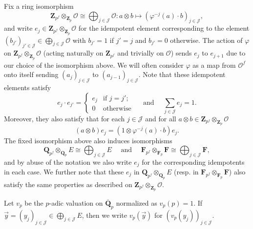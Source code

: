 \documentclass[11pt]{amsart}
\theoremstyle{definition}
\numberwithin{equation}{subsection}
\theoremstyle{plain}
\theoremstyle{plain}
\theoremstyle{plain}
\theoremstyle{plain}
\theoremstyle{plain}
\theoremstyle{plain}
\theoremstyle{plain}
\theoremstyle{plain}
\theoremstyle{plain}
\theoremstyle{plain}
\theoremstyle{plain}
\theoremstyle{plain}
\theoremstyle{definition}
\theoremstyle{definition}
\theoremstyle{definition}
\theoremstyle{remark}
\renewcommand{\(}{\textup{(}}
\renewcommand{\)}{\textup{)}}
\newcommand{\Q}{\mathbf{Q}}
\newcommand{\Z}{\mathbf{Z}}
\newcommand{\F}{\mathbf{F}}
\newcommand{\cO}{\mathcal{O}}
\newcommand{\cJ}{\mathcal{J}}
\begin{document}
Fix a ring isomorphism
\begin{equation}\label{eq: ring coefficient}
\Z_{p^f}\otimes_{\Z_p}\cO\cong \bigoplus_{j\in\cJ}\cO: a\otimes b \mapsto \left(\varphi^{-j}(a)\cdot b\right)_{j\in\cJ},
\end{equation}
and write $e_j\in\Z_{p^f}\otimes_{\Z_p}\cO$ for the idempotent element corresponding to the element $(b_{j'})_{j'\in\cJ}\in \bigoplus_{j\in\cJ}\cO$ with $b_{j'}=1$ if $j'=j$ and $b_{j'}=0$ otherwise. The action of $\varphi$ on $\Z_{p^f}\otimes_{\Z_p}\cO$ (acting naturally on $\Z_{p^f}$ and trivially on $\cO$) sends $e_j$ to $e_{j+1}$ due to our choice of the isomorphism above. We will often consider $\varphi$ as a map from $\cO^f$ onto itself sending $(a_j)_{j\in\cJ}$ to $(a_{j-1})_{j\in\cJ}$. Note that these idempotent elements satisfy
    $$e_j\cdot e_{j'}=
    \begin{cases}
    e_j & \mbox{if }j=j';\\
    0 & \mbox{otherwise}
    \end{cases}
    \quad\mbox{ and }\quad\sum_{j\in\cJ}e_j=1.
    $$
Moreover, they also satisfy that for each $j\in\cJ$ and for all $a\otimes b\in \Z_{p^f}\otimes_{\Z_p}\cO$
    \begin{equation}\label{eq: field coefficient}
    (a\otimes b)e_j=\left(1\otimes \varphi^{-j}(a)\cdot b\right)e_j.
    \end{equation}
    The fixed isomorphism above also induces isomorphisms $$\Q_{p^f}\otimes_{\Q_p}E\cong \bigoplus_{j\in\cJ}E\quad\mbox{ and }\quad\F_{p^f}\otimes_{\F_p}\F\cong \bigoplus_{j\in\cJ}\F,$$ and by abuse of the notation we also write $e_j$ for the corresponding idempotents in each case. We further note that these $e_j$ in $\Q_{p^f}\otimes_{\Q_p}E$ (resp. in $\F_{p^f}\otimes_{\F_p}\F$) also satisfy the same properties as described on $\Z_{p^f}\otimes_{\Z_p}\cO$.

Let $v_p$ be the $p$-adic valuation on $\overline{\Q}_p$ normalized as $v_p(p)=1$. If $\vec{y}=(y_j)_{j\in\cJ}\in\bigoplus_{j\in\cJ}E$, then we write $v_p(\vec{y})$ for $(v_p(y_j))_{j\in\cJ}$.
\end{document}
